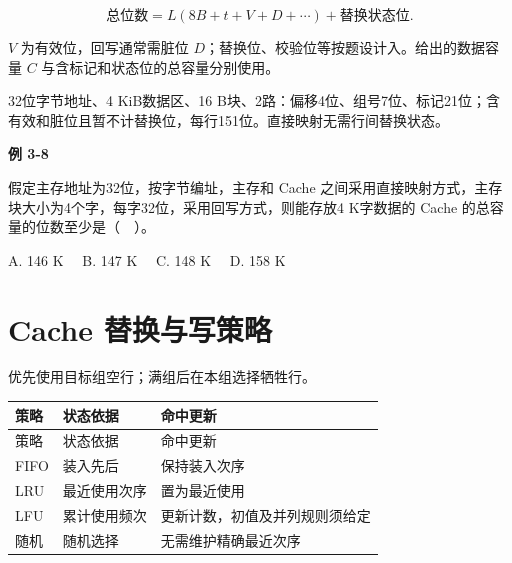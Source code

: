 \[\text{总位数}=L(8B+t+V+D+\cdots)+\text{替换状态位}.\]

\(V\) 为有效位，回写通常需脏位 \(D\)；替换位、校验位等按题设计入。给出的数据容量 \(C\) 与含标记和状态位的总容量分别使用。

32位字节地址、4 KiB数据区、16 B块、2路：偏移4位、组号7位、标记21位；含有效和脏位且暂不计替换位，每行151位。直接映射无需行间替换状态。

\par\medskip{}\noindent\hypertarget{CO03-E08}{}\label{CO03-E08}\textbf{例 3-8}\par\nobreak\smallskip

假定主存地址为32位，按字节编址，主存和 Cache 之间采用直接映射方式，主存块大小为4个字，每字32位，采用回写方式，则能存放4 K字数据的 Cache 的总容量的位数至少是（　）。

A. 146 K　 B. 147 K　 C. 148 K　 D. 158 K

\section{Cache 替换与写策略}\label{CO03-replacement}

优先使用目标组空行；满组后在本组选择牺牲行。

\par\smallskip
{\fontsize{9.3}{12}\selectfont\setlength{\tabcolsep}{2.5pt}\setlength{\LTleft}{0pt}\setlength{\LTright}{0pt}
\begin{longtable}{@{}>{\raggedright\arraybackslash}p{}>{\raggedright\arraybackslash}p{}>{\raggedright\arraybackslash}p{}@{}}
\toprule
策略 & 状态依据 & 命中更新 \\

\midrule\endfirsthead\toprule
策略 & 状态依据 & 命中更新 \\

\midrule\endhead\bottomrule\endfoot
FIFO & 装入先后 & 保持装入次序 \\

LRU & 最近使用次序 & 置为最近使用 \\

LFU & 累计使用频次 & 更新计数，初值及并列规则须给定 \\

随机 & 随机选择 & 无需维护精确最近次序 \\

\end{longtable}}
\par\smallskip

